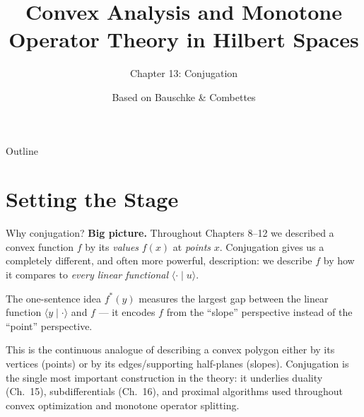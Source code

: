 \documentclass[aspectratio=169,10pt]{beamer}
\title[Convex Analysis \& MOT -- Ch.13]{Convex Analysis and Monotone Operator Theory in Hilbert Spaces}
\subtitle{Chapter 13: Conjugation}
\author{Based on Bauschke \& Combettes}
\institute{CMS Books in Mathematics, Springer, 2nd ed., 2017}
\date{}
\newcommand{\inner}[2]{\langle #1 \mid #2 \rangle}
\begin{document}
\begin{frame}
  \titlepage
\end{frame}

\begin{frame}{Outline}
  \tableofcontents
\end{frame}

\section{Setting the Stage}

\begin{frame}{Why conjugation?}
  \textbf{Big picture.} Throughout Chapters 8--12 we described a convex
  function $f$ by its \emph{values} $f(x)$ at \emph{points} $x$. Conjugation
  gives us a completely different, and often more powerful, description:
  we describe $f$ by how it compares to \emph{every linear functional}
  $\inner{\cdot}{u}$.

  \bigskip
  \begin{block}{The one-sentence idea}
    $f^*(y)$ measures the largest gap between the linear function
    $\inner{y}{\cdot}$ and $f$ --- it encodes $f$ from the ``slope''
    perspective instead of the ``point'' perspective.
  \end{block}

  \bigskip
  This is the continuous analogue of describing a convex polygon either by
  its vertices (points) or by its edges/supporting half-planes (slopes).
  Conjugation is the single most important construction in the theory: it
  underlies duality (Ch.\ 15), subdifferentials (Ch.\ 16), and proximal
  algorithms used throughout convex optimization and monotone operator
  splitting.
\end{frame}
\end{document}
